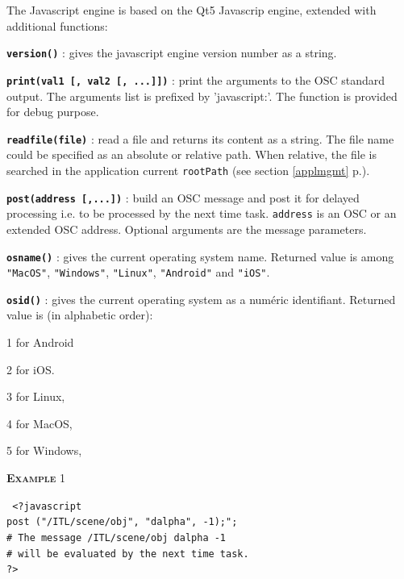 \documentclass[a4paper,twoside]{report}
\newcommand{\fullref}[1]	{\ref{#1} p.\pageref{#1}}
\newcommand{\OSC}[1]		{\texttt{#1}}
\newcommand{\example}		{\textbf{\hspace{-1.5cm}\textbf{\textsc{Example }}}}
\let\olditemize\itemize
\let\oldenditemize\enditemize
\renewenvironment{itemize} 	{\olditemize \setlength{\itemsep}{1mm}}{\oldenditemize}
\newcommand{\sample}	[1]			{\vspace{-2mm}\begin{center}\colorbox{mygrey}{
								\begin{minipage}[t]{0.9\columnwidth} 
								{\small \texttt{#1}}
								\end{minipage}}\end{center}}
\begin{document}
The Javascript engine is based on the Qt5 Javascrip engine, extended with additional functions:
\begin{itemize}
\item \textbf{\OSC{version()}} : gives the javascript engine version number as a string.
\item \textbf{\OSC{print(val1 [, val2 [, ...]])}} : print the arguments to the OSC standard output. The arguments list is prefixed by 'javascript:'. The function is provided for debug purpose.
\item \textbf{\OSC{readfile(file)}} : read a file and returns its content as a string. The file name could be specified as an absolute or relative path. When relative, the file is searched in the application current \OSC{rootPath} (see section \fullref{applmgmt}).
\item \textbf{\OSC{post(address [,...])}} : build an OSC message and post it for delayed processing i.e. to be processed by the next time task. \OSC{address} is an OSC or an extended OSC address. Optional arguments are the message parameters.
\item \textbf{\OSC{osname()}} : gives the current operating system name. Returned value is among \OSC{"MacOS"}, \OSC{"Windows"}, \OSC{"Linux"}, \OSC{"Android"} and \OSC{"iOS"}.
\item \textbf{\OSC{osid()}} : gives the current operating system as a numéric identifiant. Returned value is (in alphabetic order): 
\begin{itemize}
\item 1 for Android
\item 2 for iOS.
\item 3 for Linux, 
\item 4 for MacOS, 
\item 5 for Windows, 
\end{itemize}
\end{itemize}


\example{1}
\sample{
<?javascript \\
\hspace*{3mm} post ("/ITL/scene/obj", "dalpha", -1);";\\ 
\hspace*{3mm} \# The message /ITL/scene/obj dalpha -1 \\
\hspace*{3mm} \# will be evaluated by the next time task. \\
?>
}
\end{document}
